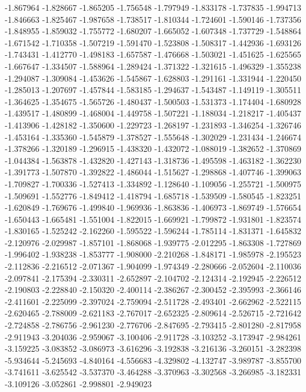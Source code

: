 -1.867964
-1.828667
-1.865205
-1.756548
-1.797949
-1.833178
-1.737835
-1.994713
-1.846663
-1.825467
-1.987658
-1.738517
-1.810344
-1.724601
-1.590146
-1.737356
-1.848955
-1.859032
-1.755772
-1.680207
-1.665052
-1.607348
-1.737729
-1.548864
-1.671542
-1.710358
-1.507219
-1.591470
-1.523808
-1.508317
-1.442936
-1.693126
-1.743431
-1.412770
-1.498183
-1.657587
-1.476668
-1.503021
-1.451625
-1.625565
-1.667647
-1.334507
-1.588964
-1.289424
-1.371322
-1.321615
-1.496329
-1.355238
-1.294087
-1.309084
-1.453626
-1.545867
-1.628803
-1.291161
-1.331944
-1.220450
-1.285013
-1.207697
-1.457844
-1.583185
-1.294637
-1.543487
-1.149119
-1.305511
-1.364625
-1.354675
-1.565726
-1.480437
-1.500503
-1.531373
-1.174404
-1.680928
-1.439517
-1.480899
-1.468004
-1.449758
-1.507221
-1.188034
-1.218217
-1.405437
-1.413906
-1.428182
-1.350600
-1.229723
-1.268197
-1.231893
-1.346254
-1.326746
-1.453164
-1.335360
-1.545879
-1.378527
-1.555648
-1.302029
-1.231434
-1.246674
-1.378266
-1.320189
-1.296915
-1.438320
-1.432072
-1.088019
-1.382652
-1.370869
-1.044384
-1.563878
-1.432820
-1.427143
-1.318736
-1.495598
-1.463182
-1.362230
-1.391773
-1.507870
-1.392822
-1.486044
-1.515627
-1.298868
-1.407746
-1.399063
-1.709827
-1.700336
-1.527413
-1.334892
-1.128640
-1.109056
-1.255721
-1.500975
-1.509691
-1.552776
-1.849412
-1.418794
-1.685718
-1.539509
-1.580545
-1.823251
-1.620849
-1.769676
-1.499840
-1.969936
-1.863836
-1.406973
-1.869749
-1.576654
-1.650443
-1.665481
-1.551004
-1.822015
-1.669921
-1.799872
-1.931801
-1.823574
-1.830165
-1.525242
-2.162260
-1.595522
-1.596244
-1.785114
-1.831371
-1.645832
-2.120976
-2.029987
-1.857101
-1.868068
-1.939775
-2.012295
-1.863308
-1.727869
-1.996402
-1.938238
-1.853777
-1.908000
-2.210268
-1.848171
-1.985978
-2.195523
-2.112836
-2.216512
-2.071367
-1.904099
-1.974349
-2.280666
-2.052604
-2.110036
-2.097841
-2.175394
-2.330311
-2.652897
-2.104702
-2.124314
-2.192945
-2.226512
-2.190803
-2.228840
-2.150320
-2.400114
-2.386267
-2.300452
-2.395993
-2.366146
-2.411601
-2.225099
-2.397024
-2.759094
-2.511728
-2.493401
-2.662962
-2.522115
-2.620465
-2.788009
-2.621183
-2.767017
-2.652325
-2.809614
-2.526715
-2.721642
-2.724858
-2.786756
-2.961230
-2.776706
-2.847695
-2.793415
-2.801280
-2.817958
-2.911943
-3.204036
-2.959067
-3.100406
-2.911728
-3.103252
-3.173947
-2.984261
-3.159225
-3.083852
-3.086973
-3.616296
-3.192838
-3.216136
-3.260151
-3.282398
-5.934644
-5.245693
-4.840164
-4.556683
-4.329802
-4.132747
-3.989787
-3.855700
-3.741611
-3.625542
-3.537370
-3.464288
-3.370963
-3.302568
-3.266985
-3.182331
-3.109126
-3.052861
-2.998801
-2.949023
